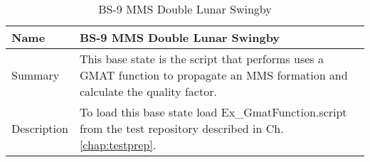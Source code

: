 \begin{table}[htbp!]
\centering
      \begin{tabular}{|p{1.05 in} |p{4.75 in} |}
      \hline
         \rowcolor[rgb]{0.8,0.8,0.8} Name & BS-9 MMS Double Lunar Swingby \\
         \hline
         Summary &
         This base state is the script that performs uses a GMAT function to propagate
         an MMS formation and calculate the quality factor.
         \\ \hline
         Description &
          To load this base state load Ex\_GmatFunction.script from the test repository described in Ch.\ref{chap:testprep}.
         \\ \hline
\end{tabular}
      \label{Table: BS-9}
      \caption{BS-9 MMS Double Lunar Swingby }
\end{table}